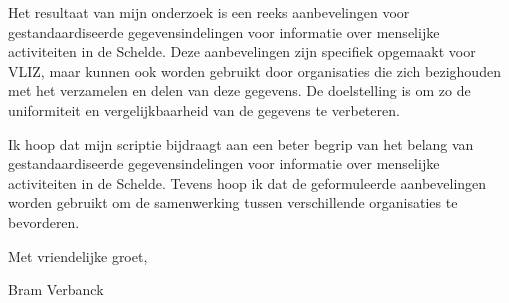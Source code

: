 Het resultaat van mijn onderzoek is een reeks aanbevelingen voor gestandaardiseerde gegevensindelingen voor informatie over menselijke activiteiten in de Schelde. Deze aanbevelingen zijn specifiek opgemaakt voor VLIZ, maar kunnen ook worden gebruikt door organisaties die zich bezighouden met het verzamelen en delen van deze gegevens. De doelstelling is om zo de uniformiteit en vergelijkbaarheid van de gegevens te verbeteren.

Ik hoop dat mijn scriptie bijdraagt aan een beter begrip van het belang van gestandaardiseerde gegevensindelingen voor informatie over menselijke activiteiten in de Schelde. Tevens hoop ik dat de geformuleerde aanbevelingen worden gebruikt om de samenwerking tussen verschillende organisaties te bevorderen.

Met vriendelijke groet,

Bram Verbanck